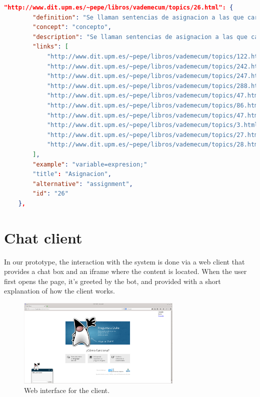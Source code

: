\begin{center} 
  \begin{lstlisting}[language=JSON, captionpos=b, caption=Example extractor, label=listing:examplejsonvademecum]   
 "http://www.dit.upm.es/~pepe/libros/vademecum/topics/26.html": {
        "definition": "Se llaman sentencias de asignacion a las que cargan un nuevo valor en una variable", 
        "concept": "concepto", 
        "description": "Se llaman sentencias de asignacion a las que cargan un nuevo valor en una variable: El tipo de la variable debe ser igual al de la expresion en tipos primitivos:  asignable por promocion (ver \"Promocion\")  asignable por reduccion (ver \"Reduccion\")  en objetos:  asignable por Upcasting (ver \"Casting\") asignable por Downcasting (ver \"Casting\")", 
        "links": [
            "http://www.dit.upm.es/~pepe/libros/vademecum/topics/122.html", 
            "http://www.dit.upm.es/~pepe/libros/vademecum/topics/242.html", 
            "http://www.dit.upm.es/~pepe/libros/vademecum/topics/247.html", 
            "http://www.dit.upm.es/~pepe/libros/vademecum/topics/288.html", 
            "http://www.dit.upm.es/~pepe/libros/vademecum/topics/47.html", 
            "http://www.dit.upm.es/~pepe/libros/vademecum/topics/86.html", 
            "http://www.dit.upm.es/~pepe/libros/vademecum/topics/47.html", 
            "http://www.dit.upm.es/~pepe/libros/vademecum/topics/3.html", 
            "http://www.dit.upm.es/~pepe/libros/vademecum/topics/27.html", 
            "http://www.dit.upm.es/~pepe/libros/vademecum/topics/28.html"
        ], 
        "example": "variable=expresion;"
        "title": "Asignacion", 
        "alternative": "assignment", 
        "id": "26"
    }, 

  \end{lstlisting}
\end{center}


\section{Chat client}
\label{sec:chatclient}

In our prototype, the interaction with the system is done via a web client that provides a chat box and an iframe where the content is located. When the user first opens the page, it's greeted by the bot, and provided with a   short explanation of how the client works.

\begin{figure}[!htbp]
    \centering
    \includegraphics[width=0.7\textwidth]{img/screens/ask-client.png}
    \caption{Web interface for the client.}
    \label{fig:chat1}
\end{figure}

